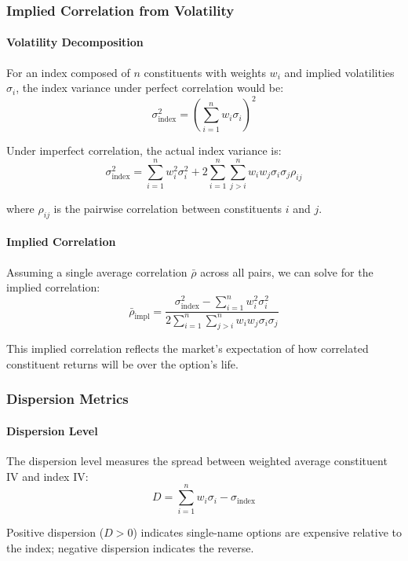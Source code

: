 \subsubsection{Implied Correlation from Volatility}

\paragraph{Volatility Decomposition}

For an index composed of $n$ constituents with weights $w_i$ and implied volatilities $\sigma_i$, the index variance under perfect correlation would be:
\[
\sigma_{\text{index}}^2 = \left( \sum_{i=1}^n w_i \sigma_i \right)^2
\]

Under imperfect correlation, the actual index variance is:
\[
\sigma_{\text{index}}^2 = \sum_{i=1}^n w_i^2 \sigma_i^2 + 2 \sum_{i=1}^n \sum_{j>i}^n w_i w_j \sigma_i \sigma_j \rho_{ij}
\]

where $\rho_{ij}$ is the pairwise correlation between constituents $i$ and $j$.

\paragraph{Implied Correlation}

Assuming a single average correlation $\bar{\rho}$ across all pairs, we can solve for the implied correlation:
\[
\bar{\rho}_{\text{impl}} = \frac{\sigma_{\text{index}}^2 - \sum_{i=1}^n w_i^2 \sigma_i^2}{2 \sum_{i=1}^n \sum_{j>i}^n w_i w_j \sigma_i \sigma_j}
\]

This implied correlation reflects the market's expectation of how correlated constituent returns will be over the option's life.

\subsubsection{Dispersion Metrics}

\paragraph{Dispersion Level}

The dispersion level measures the spread between weighted average constituent IV and index IV:
\[
D = \sum_{i=1}^n w_i \sigma_i - \sigma_{\text{index}}
\]

Positive dispersion ($D > 0$) indicates single-name options are expensive relative to the index; negative dispersion indicates the reverse.

